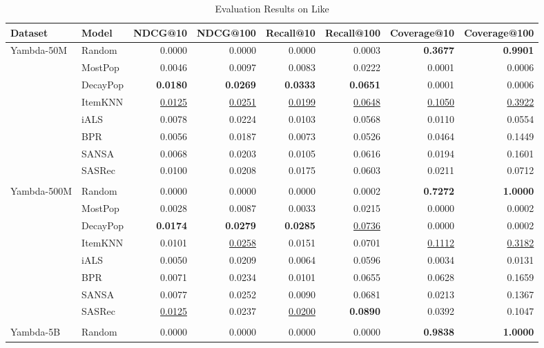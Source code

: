 \documentclass[sigconf,authorversion,nonacm]{acmart}
\begin{document}
\begin{table}
  \caption{Evaluation Results on Like}
  \label{tab:eval_like}
  \begin{tabular}{llrrrrrr}
    \toprule
    Dataset & Model & NDCG@10 & NDCG@100 & Recall@10 & Recall@100 & Coverage@10 & Coverage@100 \\
    \midrule
    Yambda-50M & Random & 0.0000 & 0.0000 & 0.0000 & 0.0003 & \textbf{0.3677} & \textbf{0.9901} \\
    & MostPop & 0.0046 & 0.0097 & 0.0083 & 0.0222 & 0.0001 & 0.0006 \\
    & DecayPop & \textbf{0.0180} & \textbf{0.0269} & \textbf{0.0333} & \textbf{0.0651} & 0.0001 & 0.0006 \\
    & ItemKNN & \underline{0.0125} & \underline{0.0251} & \underline{0.0199} & \underline{0.0648} & \underline{0.1050} & \underline{0.3922} \\
    & iALS & 0.0078 & 0.0224 & 0.0103 & 0.0568 & 0.0110 & 0.0554 \\
    & BPR & 0.0056 & 0.0187 & 0.0073 & 0.0526 & 0.0464 & 0.1449 \\
    & SANSA & 0.0068 & 0.0203 & 0.0105 & 0.0616 & 0.0194 & 0.1601 \\
    & SASRec & 0.0100 & 0.0208 & 0.0175 & 0.0603 & 0.0211 & 0.0712 \\
    \hline & \\[-2.2ex]
    Yambda-500M & Random & 0.0000 & 0.0000 & 0.0000 & 0.0002 & \textbf{0.7272} & \textbf{1.0000} \\
    & MostPop & 0.0028 & 0.0087 & 0.0033 & 0.0215 & 0.0000 & 0.0002 \\
    & DecayPop & \textbf{0.0174} & \textbf{0.0279} & \textbf{0.0285} & \underline{0.0736} & 0.0000 & 0.0002 \\
    & ItemKNN & 0.0101 & \underline{0.0258} & 0.0151 & 0.0701 & \underline{0.1112} & \underline{0.3182} \\
    & iALS & 0.0050 & 0.0209 & 0.0064 & 0.0596 & 0.0034 & 0.0131 \\
    & BPR & 0.0071 & 0.0234 & 0.0101 & 0.0655 & 0.0628 & 0.1659 \\
    & SANSA & 0.0077 & 0.0252 & 0.0090 & 0.0681 & 0.0213 & 0.1367 \\
    & SASRec & \underline{0.0125} & 0.0237 & \underline{0.0200} & \textbf{0.0890} & 0.0392 & 0.1047 \\
    \hline & \\[-2.2ex]
    Yambda-5B & Random & 0.0000 & 0.0000 & 0.0000 & 0.0000 & \textbf{0.9838} & \textbf{1.0000} \\

\end{tabular}
\end{table}
\end{document}
